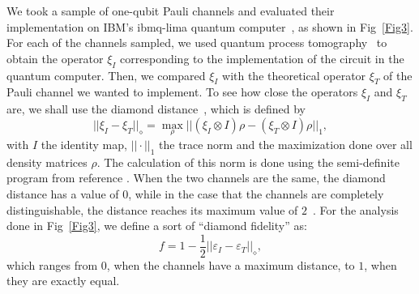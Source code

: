 \documentclass[10pt,letterpaper]{article} %
\newcommand{\fref}[1]{Fig~\ref{#1}}
\begin{document}

We took a sample of one-qubit Pauli channels
and evaluated their implementation on IBM's
ibmq-lima quantum computer~\cite{Qiskit},
as shown in \fref{Fig3}. 
For each of the channels sampled, we used 
quantum process tomography~\cite{Qiskit, Chuang:1996} to obtain the 
operator $\xi_I$ corresponding to the implementation of the
circuit in the quantum computer. 
Then, we compared $\xi_I$ with the theoretical 
operator $\xi_T$ of the Pauli channel we wanted to implement.
To see how close the operators $\xi_I$ and 
$\xi_T$ are, we shall use the
diamond distance~\cite{wildebook}, which is defined by
\begin{equation}
||\xi_I - \xi_T ||_{\diamond}  = \max_{\rho} || (\xi_I \otimes I) \rho - (\xi_T \otimes I) \rho ||_1,
\end{equation}
with $I$ the identity map,
$|| \cdot ||_1$ the trace norm and the maximization
done over all density matrices $\rho$.
The calculation of this norm is done using the semi-definite program from reference \cite{Watrous}.
When the two channels are the same,
the diamond distance has a value of $0$, while in the case that the channels
are completely distinguishable, the distance reaches its maximum value of $2$~\cite{Benenti}.
For the analysis done in \fref{Fig3}, we define a sort of ``diamond fidelity'' as: 
\begin{equation}
f = 1 - \dfrac{1}{2} ||\varepsilon_I - \varepsilon_T ||_{\diamond},
\label{eq:diamond-fid}
\end{equation}
which ranges from $0$, when the channels have a maximum distance, to  $1$,
when they are exactly equal.
\end{document}
